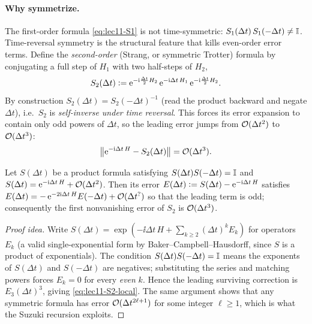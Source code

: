 \paragraph{Why symmetrize.}
The first-order formula \eqref{eq:lec11-S1} is not time-symmetric:
$S_1(\Delta t)\,S_1(-\Delta t)\neq\mathbb{I}$. Time-reversal symmetry is the structural feature
that kills even-order error terms. Define the \emph{second-order} (Strang, or symmetric
Trotter) formula by conjugating a full step of $H_1$ with two half-steps of $H_2$,
\begin{equation}
  S_2(\Delta t)\vcentcolon=\mathrm{e}^{-\mathrm{i}\frac{\Delta t}{2}H_2}\,\mathrm{e}^{-\mathrm{i}\Delta t\,H_1}\,
    \mathrm{e}^{-\mathrm{i}\frac{\Delta t}{2}H_2}.
  \label{eq:lec11-S2}
\end{equation}
By construction $S_2(\Delta t)=S_2(-\Delta t)^{-1}$ (read the product backward and negate
$\Delta t$), i.e.\ $S_2$ is \emph{self-inverse under time reversal}. This forces its error
expansion to contain only odd powers of $\Delta t$, so the leading error jumps from
$\mathcal{O}(\Delta t^2)$ to $\mathcal{O}(\Delta t^3)$:
\begin{equation}
  \left\lVert \mathrm{e}^{-\mathrm{i}\Delta t\,H}-S_2(\Delta t) \right\rVert=\mathcal{O}(\Delta t^3).
  \label{eq:lec11-S2-local}
\end{equation}

\begin{proposition}
\label{prop:lec11-symmetry}
Let $S(\Delta t)$ be a product formula satisfying $S(\Delta t)S(-\Delta t)=\mathbb{I}$ and
$S(\Delta t)=\mathrm{e}^{-\mathrm{i}\Delta t\,H}+\mathcal{O}(\Delta t^2)$. Then its error
$E(\Delta t)\vcentcolon= S(\Delta t)-\mathrm{e}^{-\mathrm{i}\Delta t\,H}$ satisfies
$E(\Delta t)=-\,\mathrm{e}^{-2\mathrm{i}\Delta t\,H}E(-\Delta t)+\mathcal{O}(\Delta t^{?})$ so that the
leading term is odd; consequently the first nonvanishing error of $S_2$ is
$\mathcal{O}(\Delta t^3)$.
\end{proposition}

\begin{proof}[Proof idea]
Write $S(\Delta t)=\exp(-\ii\Delta t\,H+\sum_{k\ge2}(\Delta t)^k E_k)$ for operators
$E_k$ (a valid single-exponential form by Baker--Campbell--Hausdorff, since $S$ is a
product of exponentials). The condition $S(\Delta t)S(-\Delta t)=\mathbb{I}$ means the exponents
of $S(\Delta t)$ and $S(-\Delta t)$ are negatives; substituting the series and matching
powers forces $E_k=0$ for every \emph{even} $k$. Hence the leading surviving correction
is $E_3(\Delta t)^3$, giving \eqref{eq:lec11-S2-local}. The same argument shows that any
symmetric formula has error $\mathcal{O}(\Delta t^{2\ell+1})$ for some integer $\ell\ge1$,
which is what the Suzuki recursion exploits.
\end{proof}

